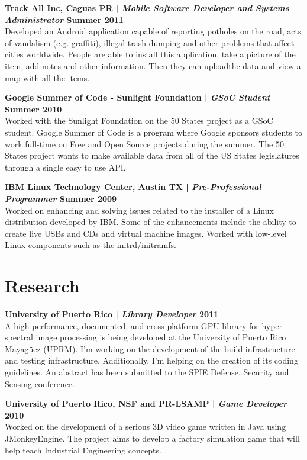 \documentclass[margin,line]{res}
\begin{document}
\begin{resume}
{\bf Track All Inc, Caguas PR | {\em Mobile Software Developer and Systems Administrator} \hfill {\bf Summer 2011 \\} }
\vspace{-.01cm}
Developed an Android application capable of reporting potholes on the road, acts of vandalism (e.g. graffiti), illegal trash dumping and other problems that affect cities worldwide. People are able to install this application, take a picture of the item, add notes and other information. Then they can uploadthe data and view a map with all the items.

{\bf Google Summer of Code - Sunlight Foundation | {\em GSoC Student} \hfill {\bf Summer 2010 \\} }
\vspace{-.01cm}
Worked with the Sunlight Foundation on the 50 States project as a GSoC student. Google Summer of Code is a program where Google sponsors students to work full-time on Free and Open Source projects during the summer. The 50 States project wants to make available data from all of the US States legislatures through a single easy to use API.

{\bf IBM Linux Technology Center, Austin TX | {\em Pre-Professional Programmer} \hfill {\bf Summer 2009 \\} }
\vspace{-.01cm}
Worked on enhancing and solving issues related to the installer of a Linux distribution developed
by IBM. Some of the enhancements include the ability to create live USBs and CDs and virtual
machine images. Worked with low-level Linux components such as the initrd/initramfs.

\section{\sc Research}

{\bf University of Puerto Rico | {\em Library Developer} \hfill {\bf 2011 \\} }
\vspace{-.01cm}
A high performance, documented, and cross-platform GPU library for hyper-spectral image processing is being developed at the University of Puerto Rico Mayagüez (UPRM). I'm working on the development of the build infrastructure and testing infrastructure. Additionally, I'm helping on the creation of its coding guidelines. An abstract has been submitted to the SPIE Defense, Security and Sensing conference. 

{\bf University of Puerto Rico, NSF and PR-LSAMP | {\em Game Developer} \hfill {\bf 2010 \\} }
\vspace{-.01cm}
Worked on the development of a serious 3D video game written in Java using JMonkeyEngine. The project aims to develop a factory simulation game that will help teach Industrial Engineering concepts.


\end{resume}
\end{document}
